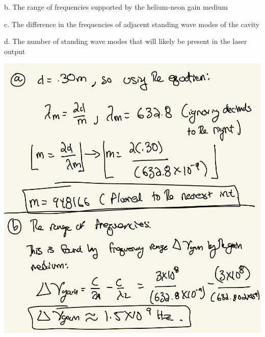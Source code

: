 \documentclass[10pt]{article}
\begin{document}
b. The range of frequencies supported by the helium-neon gain medium

c. The difference in the frequencies of adjacent standing wave modes of
the cavity

d. The number of standing wave modes that will likely be present in the
laser output

\begin{center}
    \includegraphics*[scale = .2]{imgs/cavity-example.jpeg}
\end{center}

\newpage
\end{document}
